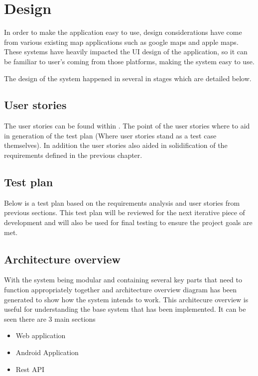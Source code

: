 \section{Design}
In order to make the application easy to use, design considerations have come from various existing map applications such as google maps and apple maps. These systems have heavily impacted the UI design of the application, so it can be familiar to user's coming from those platforms, making the system easy to use.

The design of the system happened in several in stages which are detailed below.

\subsection{User stories}
The user stories can be found within \appendixtemp. The point of the user stories where to aid in generation of the test plan (Where user stories stand as a test case themselves). In addition the user stories also aided in solidification of the requirements defined in the previous chapter. 

\subsection{Test plan}
Below is a test plan based on the requirements analysis and user stories from previous sections. This test plan will be reviewed for the next iterative piece of development and will also be used for final testing to ensure the project goals are met.

\subsection{Architecture overview}
With the system being modular and containing several key parts that need to function appropriately together and architecture overview diagram has been generated to show how the system intends to work. This architecure overview is useful for understanding the base system that has been implemented. It can be seen there are 3 main sections

\begin{itemize}
	\item Web application
	\item Android Application
	\item Rest API
\end{itemize}

